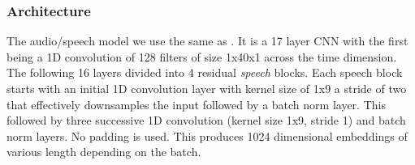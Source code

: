 \subsubsection{Architecture}
The audio/speech model we use the same as \cite{harwath2019learning}. 
It is a 17 layer CNN with the first being a 1D convolution of 128 filters of size 1x40x1 across the time dimension.
The following 16 layers divided into 4 residual \textit{speech} blocks.
Each speech block starts with an initial 1D convolution layer with kernel size of 1x9 a stride of two that effectively downsamples the input followed by a batch norm layer.
This followed by three successive 1D convolution (kernel size 1x9, stride 1) and batch norm layers.
No padding is used.
This produces 1024 dimensional embeddings of various length depending on the batch.



%
